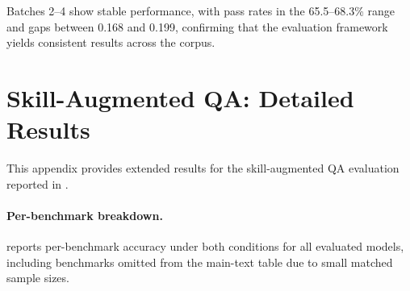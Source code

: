 Batches 2--4 show stable performance, with pass rates in the 65.5--68.3\% range and \rbu gaps between 0.168 and 0.199, confirming that the evaluation framework yields consistent results across the corpus.


\section{Skill-Augmented QA: Detailed Results}
\label{app:ablation_details}

This appendix provides extended results for the skill-augmented QA evaluation reported in .

\paragraph{Per-benchmark breakdown.}
 reports per-benchmark accuracy under both conditions for all evaluated models, including benchmarks omitted from the main-text table due to small matched sample sizes.

